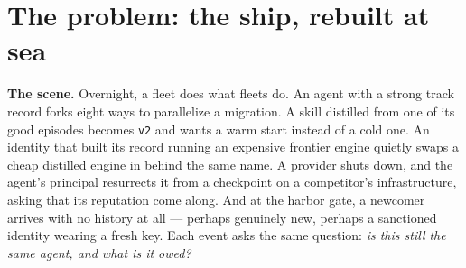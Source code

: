 \documentclass[11pt,a4paper]{article}
\begin{document}
\section{The problem: the ship, rebuilt at sea}\label{sec:problem}

\textbf{The scene.} Overnight, a fleet does what fleets do. An agent with a strong track record forks eight ways to parallelize a
migration. A skill distilled from one of its good episodes becomes \texttt{v2} and wants a warm start instead of a cold one. An
identity that built its record running an expensive frontier engine quietly swaps a cheap distilled engine in behind the same name.
A provider shuts down, and the agent's principal resurrects it from a checkpoint on a competitor's infrastructure, asking that its
reputation come along. And at the harbor gate, a newcomer arrives with no history at all --- perhaps genuinely new, perhaps a
sanctioned identity wearing a fresh key. Each event asks the same question: \emph{is this still the same agent, and what is it owed?}
\end{document}
